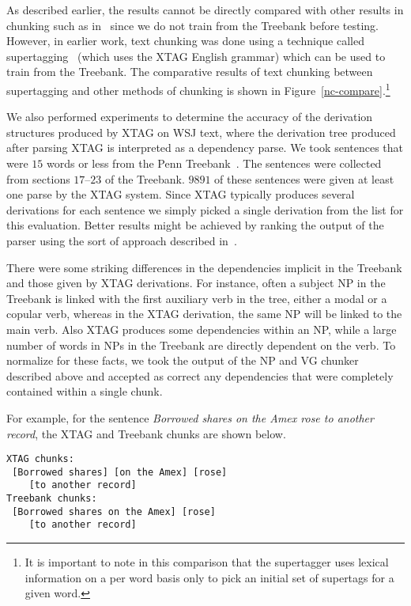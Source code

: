 As described earlier, the results cannot be directly compared with
other results in chunking such as in~\cite{lance&mitch95} since we do
not train from the Treebank before testing. However, in earlier work,
text chunking was done using a technique called
supertagging~\cite{srini97iwpt} (which uses the XTAG English grammar)
which can be used to train from the Treebank.  The comparative results
of text chunking between supertagging and other methods of chunking is
shown in Figure~\ref{nc-compare}.\footnote{It is important to note in
  this comparison that the supertagger uses lexical information on a
  per word basis only to pick an initial set of supertags for a given
  word.}

We also performed experiments to determine the accuracy of the
derivation structures produced by XTAG on WSJ text, where the
derivation tree produced after parsing XTAG is interpreted as a
dependency parse. We took sentences that were $15$ words or less from
the Penn Treebank~\cite{marcus93}. The sentences were collected from
sections $17$--$23$ of the Treebank. $9891$ of these sentences were
given at least one parse by the XTAG system. Since XTAG typically
produces several derivations for each sentence we simply picked a
single derivation from the list for this evaluation. Better results
might be achieved by ranking the output of the parser using the sort
of approach described in~\cite{srinietal95}.

There were some striking differences in the dependencies implicit in
the Treebank and those given by XTAG derivations. For instance, often
a subject NP in the Treebank is linked with the first auxiliary verb
in the tree, either a modal or a copular verb, whereas in the XTAG
derivation, the same NP will be linked to the main verb. Also XTAG
produces some dependencies within an NP, while a large number of words
in NPs in the Treebank are directly dependent on the verb. To
normalize for these facts, we took the output of the NP and VG chunker
described above and accepted as correct any dependencies that were
completely contained within a single chunk.

For example, for the sentence {\em Borrowed shares on the Amex rose to
another record}, the XTAG and Treebank chunks are shown below.

\begin{verbatim}
XTAG chunks:     
 [Borrowed shares] [on the Amex] [rose] 
    [to another record] 
Treebank chunks: 
 [Borrowed shares on the Amex] [rose] 
    [to another record] 
\end{verbatim}

